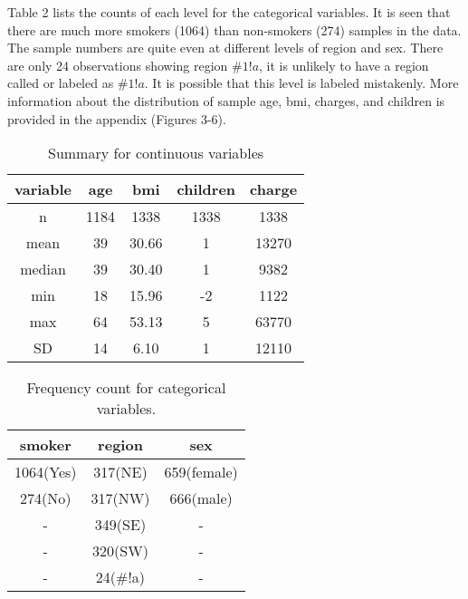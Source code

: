 \documentclass[12pt]{article}
\begin{document}
\medskip

Table 2 lists the counts of each level for the categorical variables. It is seen that there are much more smokers (1064) than non-smokers (274) samples in the data. The sample numbers are quite even at different levels of region and sex. There are only 24 observations showing region $\#1!a$, it is unlikely to have a region called or labeled as $\#1!a$. It is possible that this level is labeled mistakenly. More information about the distribution of sample age, bmi, charges, and children is provided in the appendix (Figures 3-6).

\begin{table}[ht]
\centering 
\caption{ Summary for continuous variables\label{data3}}
\begin{tabular}{|c|c|c|c|c|}\hline
variable& age& bmi& children& charge\\\hline
n& 1184& 1338& 1338& 1338\\\hline
mean& 39& 30.66& 1& 13270\\\hline
median& 39& 30.40& 1& 9382\\\hline
min& 18& 15.96& -2& 1122\\\hline
max& 64& 53.13& 5& 63770\\\hline
SD& 14& 6.10& 1& 12110\\\hline
\end{tabular}
\end{table}

\begin{table}[ht]
\centering
\caption{ Frequency count for categorical variables.\label{data3}}
\begin{tabular}{|c|c|c|}\hline
smoker&	region&	sex\\\hline
1064(Yes)& 317(NE)& 659(female)\\\hline
274(No)& 317(NW)& 666(male)\\\hline
-& 349(SE)& -\\\hline
-& 320(SW)& -\\\hline
-& 24(\#!a)& -\\\hline
\end{tabular}
\end{table}
\end{document}
